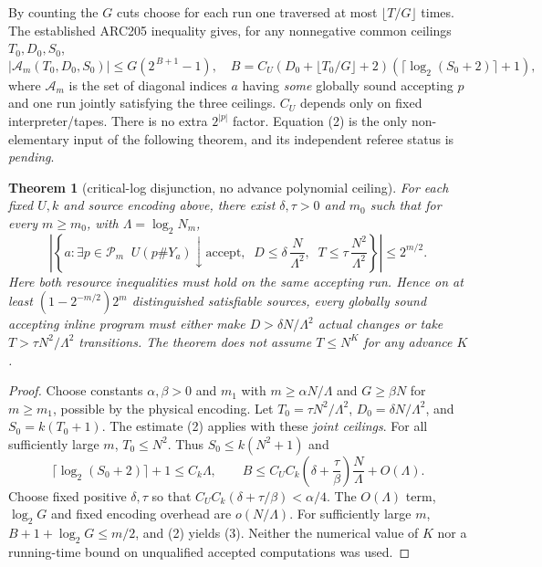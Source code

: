 \documentclass[11pt]{article}
\newtheorem{theorem}{Theorem}
\begin{document}
By counting the $G$ cuts choose for each run one traversed at most
$\lfloor T/G\rfloor$ times. The established ARC205 inequality gives,
for any nonnegative common ceilings $T_0,D_0,S_0$,
\[
\boxed{
|\mathcal A_m(T_0,D_0,S_0)|\le
G\!\left(2^{\,B+1}-1\right),\quad
B=C_U(D_0+\lfloor T_0/G\rfloor+2)
       (\lceil\log_2(S_0+2)\rceil+1),
}
\tag{2}
\]
where $\mathcal A_m$ is the set of diagonal indices $a$
having \emph{some} globally sound accepting $p$ and one
run jointly satisfying the three ceilings. $C_U$ depends
only on fixed interpreter/tapes. There is no extra
$2^{|p|}$ factor. Equation (2) is the only non-elementary
input of the following theorem, and its independent
referee status is \emph{pending}.

\begin{theorem}[critical-log disjunction, no advance polynomial ceiling]
\label{th:critical}
For each fixed $U,k$ and source encoding above, there exist
$\delta,\tau>0$ and $m_0$ such that for every $m\ge m_0$,
with $\Lambda=\log_2N_m$,
\[
\left|\left\{a:\exists p\in\mathcal P_m\;\;
U(p\#Y_a)\downarrow\mathrm{accept},\;\;
D\le\delta\,\frac{N}{\Lambda^2},\;\;
T\le\tau\,\frac{N^2}{\Lambda^2}
\right\}\right|\le2^{m/2}.
\tag{3}
\]
Here both resource inequalities must hold on the \emph{same
accepting run}. Hence on at least $(1-2^{-m/2})2^m$
distinguished satisfiable sources, every globally sound accepting
inline program must either make
$D>\delta N/\Lambda^2$ actual changes or
take $T>\tau N^2/\Lambda^2$ transitions.
The theorem does \emph{not} assume $T\le N^K$ for any advance $K$.
\end{theorem}
\begin{proof}
Choose constants $\alpha,\beta>0$ and $m_1$ with
$m\ge\alpha N/\Lambda$ and $G\ge\beta N$
for $m\ge m_1$, possible by the physical encoding.
Let $T_0=\tau N^2/\Lambda^2$,
$D_0=\delta N/\Lambda^2$, and $S_0=k(T_0+1)$.
The estimate (2) applies with these \emph{joint ceilings}.
For all sufficiently large $m$, $T_0\le N^2$.
Thus $S_0\le k(N^2+1)$ and
\[
\lceil\log_2(S_0+2)\rceil+1
\le C_k\Lambda,\qquad
B\le C_UC_k\left(\delta+\frac{\tau}{\beta}\right)
                \frac{N}{\Lambda}+O(\Lambda).
\tag{4}
\]
Choose fixed positive $\delta,\tau$ so that
$C_UC_k(\delta+\tau/\beta)<\alpha/4$.
The $O(\Lambda)$ term, $\log_2G$ and fixed
encoding overhead are $o(N/\Lambda)$.
For sufficiently large $m$,
$B+1+\log_2G\le m/2$, and (2) yields (3).
Neither the numerical value of $K$ nor a running-time
bound on unqualified accepted computations was used.
\end{proof}
\end{document}
